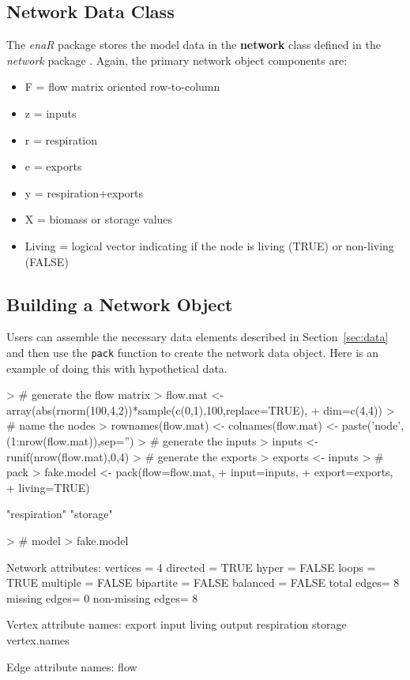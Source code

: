 \documentclass[article]{jss}
\begin{document}
\subsection{Network Data Class}

The \textit{enaR} package stores the model data in the \textbf{network}
class defined in the \textit{network} package \citep[see][for
details]{butts08_network}. Again, the primary network object
components are:

\begin{itemize}
\item F = flow matrix oriented row-to-column
\item z = inputs
\item r = respiration
\item e = exports
\item y = respiration+exports
\item X = biomass or storage values
\item Living = logical vector indicating if the node is living
  (TRUE) or non-living (FALSE)
\end{itemize}

\subsection{Building a Network Object}
Users can assemble the necessary data elements described in
Section~\ref{sec:data} and then use the \texttt{pack} function to create the
network data object.  Here is an example of doing this with
hypothetical data.

\begin{Schunk}
\begin{Sinput}
> # generate the flow matrix
> flow.mat <- array(abs(rnorm(100,4,2))*sample(c(0,1),100,replace=TRUE),
+                    dim=c(4,4))
> # name the nodes
> rownames(flow.mat) <- colnames(flow.mat) <- paste('node',(1:nrow(flow.mat)),sep='')
> # generate the inputs
> inputs <- runif(nrow(flow.mat),0,4)
> # generate the exports
> exports <- inputs
> # pack
> fake.model <- pack(flow=flow.mat,
+                     input=inputs,
+                     export=exports,
+                     living=TRUE)
\end{Sinput}
\begin{Soutput}
[1] "respiration" "storage"    
\end{Soutput}
\begin{Sinput}
> # model
> fake.model
\end{Sinput}
\begin{Soutput}
 Network attributes:
  vertices = 4 
  directed = TRUE 
  hyper = FALSE 
  loops = TRUE 
  multiple = FALSE 
  bipartite = FALSE 
  balanced = FALSE 
  total edges= 8 
    missing edges= 0 
    non-missing edges= 8 

 Vertex attribute names: 
    export input living output respiration storage vertex.names 

 Edge attribute names: 
    flow 
\end{Soutput}
\end{Schunk}
\end{document}
